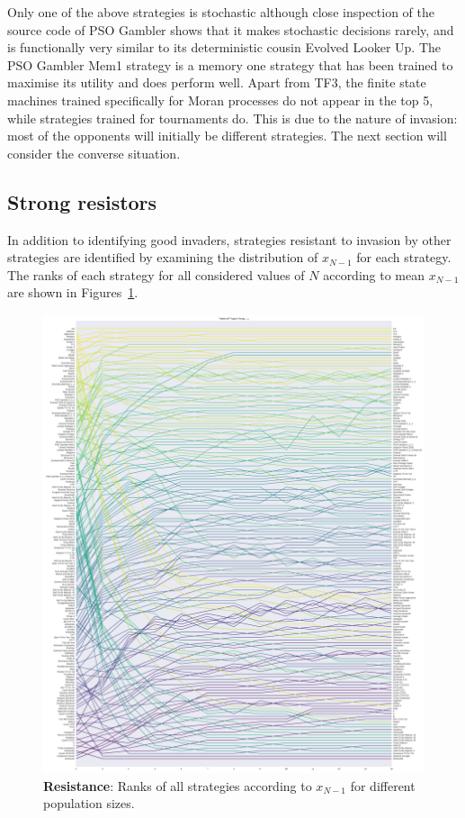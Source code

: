 \documentclass{article}
\begin{document}
Only one of the above strategies is stochastic although close inspection of the
source code of PSO Gambler shows that it makes stochastic decisions rarely, and
is functionally very similar to its deterministic cousin Evolved Looker Up.
The PSO Gambler Mem1 strategy is a memory one strategy that has been trained to
maximise its utility and does perform well.
Apart from TF3, the finite state machines trained specifically for
Moran processes do not appear in the top 5, while strategies trained for
tournaments do. This is due to the nature of invasion: most of the opponents
will initially be different strategies. The next section will consider the
converse situation.

\subsection{Strong resistors}\label{sec:strong_resistors}

In addition to identifying good invaders, strategies resistant to invasion by
other strategies are identified by examining the distribution of $x_{N-1}$ for
each strategy. The ranks of each strategy for all considered values of \(N\)
according to mean \(x_{N-1}\) are shown in
Figures~\ref{fig:ranks_v_size_resist}.

\begin{figure}[!hbtp]
    \centering
    \includegraphics[height=.9\textheight]{./img/average_rank_vs_population_size_resist.pdf}
    \caption{\textbf{Resistance}: Ranks of all strategies according to \(x_{N-1}\) for different
    population sizes.}
    \label{fig:ranks_v_size_resist}
\end{figure}
\end{document}
